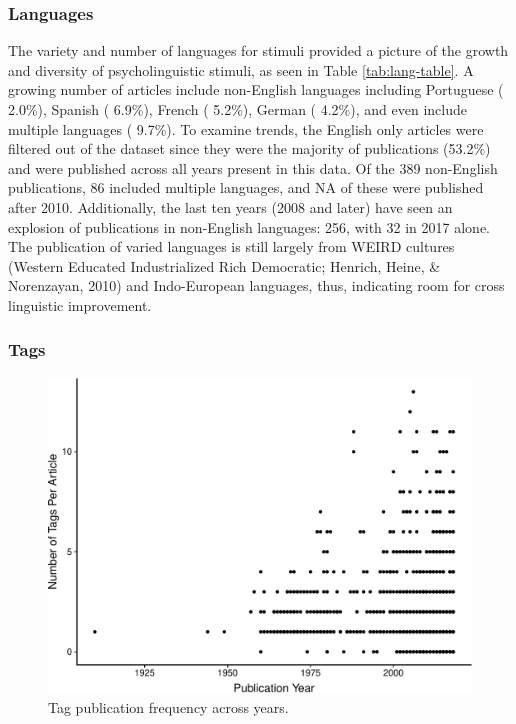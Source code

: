 \documentclass[english,,man]{apa6}
\theoremstyle{definition}
\theoremstyle{definition}
\theoremstyle{definition}
\theoremstyle{remark}
\begin{document}
\hypertarget{languages}{%
\subsubsection{Languages}\label{languages}}

The variety and number of languages for stimuli provided a picture of
the growth and diversity of psycholinguistic stimuli, as seen in Table
\ref{tab:lang-table}. A growing number of articles include non-English
languages including Portuguese ( 2.0\%), Spanish ( 6.9\%), French (
5.2\%), German ( 4.2\%), and even include multiple languages ( 9.7\%).
To examine trends, the English only articles were filtered out of the
dataset since they were the majority of publications (53.2\%) and were
published across all years present in this data. Of the 389 non-English
publications, 86 included multiple languages, and NA of these were
published after 2010. Additionally, the last ten years (2008 and later)
have seen an explosion of publications in non-English languages: 256,
with 32 in 2017 alone. The publication of varied languages is still
largely from WEIRD cultures (Western Educated Industrialized Rich
Democratic; Henrich, Heine, \& Norenzayan, 2010) and Indo-European
languages, thus, indicating room for cross linguistic improvement.

\hypertarget{tags}{%
\subsubsection{Tags}\label{tags}}

\begin{figure}
\centering
\includegraphics{LAB_files/figure-latex/tag-fig-1.pdf}
\caption{\label{fig:tag-fig}Tag publication frequency across years.}
\end{figure}
\end{document}
